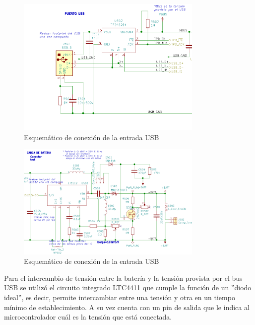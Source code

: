 \begin{figure}[!htbp]
	\centering
	
	\includegraphics[width=0.8\textwidth]{./Figures/usbesq.png}		

	
	\caption{Esquemático de conexión de la entrada USB}
	\label{fig:usbesq}
\end{figure}

\begin{figure}[!htbp]
	\centering
	

	\includegraphics[width=0.8\textwidth]{./Figures/cargaesq.png}		

	
	\caption{Esquemático de conexión de la entrada USB}
	\label{fig:cargaesq}
\end{figure}


Para el intercambio de tensión entre la batería y la tensión provista por el bus USB se utilizó el circuito integrado LTC4411 que cumple la función de un ''diodo ideal'', es decir, permite intercambiar entre una tensión y otra en un tiempo mínimo de establecimiento. A su vez cuenta con un pin de salida que le indica al microcontrolador cuál es la tensión que está conectada.


